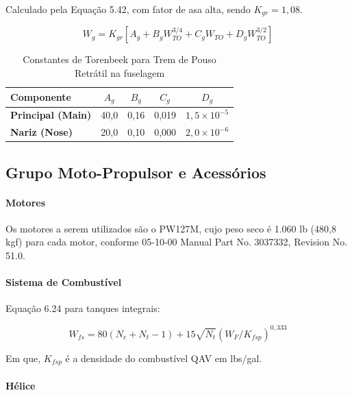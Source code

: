 Calculado pela Equação 5.42, com fator de asa alta, sendo $K_{gr} = 1,08$.

\begin{equation}
W_g = K_{gr} \left[
A_g + B_g W_{TO}^{3/4} + C_g W_{TO} + D_g W_{TO}^{3/2}
\right]
\end{equation}

\begin{table}[H]
  \centering
  \linespread{1}\small
  \setlength{\tabcolsep}{4pt}
  \caption{Constantes de Torenbeek para Trem de Pouso Retrátil na fuselagem}
  \label{tab:peso_trem_constantes}
  \begin{tabularx}{\textwidth}{>{\raggedright\arraybackslash}X c c c c}
    \toprule
    \textbf{Componente} & $A_g$ & $B_g$ & $C_g$ & $D_g$ \\
    \midrule
    \textbf{Principal (Main)} & 40,0 & 0,16 & 0,019 & $1,5 \times 10^{-5}$ \\
    \textbf{Nariz (Nose)} & 20,0 & 0,10 & 0,000 & $2,0 \times 10^{-6}$ \\
    \bottomrule
  \end{tabularx}
\end{table}

\subsection{Grupo Moto-Propulsor e Acessórios}

\paragraph{Motores}

Os motores a serem utilizados são o PW127M, cujo peso seco é 1.060 lb (480,8 kgf) para cada motor, conforme 05-10-00 Manual Part No. 3037332, Revision No. 51.0.

\paragraph{Sistema de Combustível}

Equação 6.24 para tanques integrais:

\begin{equation}
W_{fs} = 80(N_e + N_t - 1) + 15\sqrt{N_t} (W_F / K_{fsp})^{0,333}
\end{equation}

Em que, $K_{fsp}$ é a densidade do combustível QAV em lbs/gal.


\paragraph{Hélice}

